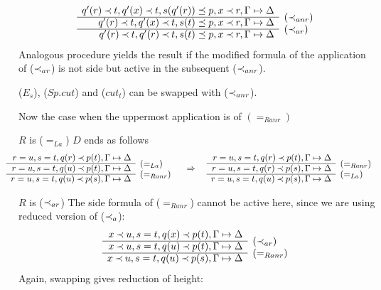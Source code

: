 \begin{PROOF}
\begin{LS}
\[ \begin{array}{rl}
q'(r)\Incl t, q'(x)\Incl t, s(q'(r))\preceq p, x\Incl r, \Gamma\Seq\Delta \\ \cline{1-1}
q'(r)\Incl t, q'(x)\Incl t, s(t)\preceq p, x\Incl r, \Gamma\Seq\Delta  &
\raisebox{1.2ex}[1.5ex][0ex]{$(\Incl_{anr})$} \\ \cline{1-1}
q'(r)\Incl t, q'(r)\Incl t, s(t)\preceq p, x\Incl r, \Gamma\Seq\Delta  &
\raisebox{1.2ex}[1.5ex][0ex]{$(\Incl_{ar})$}
\end{array} \]
Analogous procedure yields the result if the modified formula of the
application of ($\mathbin{\prec}_{ar}$) is not side but active in the subsequent ($\mathbin{\prec}_{anr}$).
%
\item ($E_s$), ($Sp.cut$) and ($cut_t$) can be swapped with ($\mathbin{\prec}_{anr}$).
\end{LS}
Now the case when the uppermost application is of $(=_{Ranr})$
\begin{LS}
\item $R$ is ($=_{La}$) $D$ ends as follows
\[ \hspace*{-1.5em}  \begin{array}{rl} 
r=u, s=t, q(r)\Incl p(t), \GSD \\ \cline{1-1}
r=u, s=t, q(u)\Incl p(t), \GSD & \rabove{(=_{La})} \\ \cline{1-1}
r=u, s=t, q(u)\Incl p(s), \GSD & \rabove{(=_{Ranr})} \end{array} \conv
\begin{array}{rl}
r=u, s=t, q(r)\Incl p(t), \GSD \\ \cline{1-1}
r=u, s=t, q(r)\Incl p(s), \GSD & \rabove{(=_{Ranr})} \\ \cline{1-1}
r=u, s=t, q(u)\Incl p(s), \GSD & \rabove{(=_{La})} \end{array} \]
%
\item $R$ is ($\mathbin{\prec}_{ar}$) The side formula of ($=_{Ranr}$) cannot be active
here, since we are using reduced version of ($\mathbin{\prec}_a$):
\[ \begin{array}{rl}
x\Incl u, s=t, q(x)\Incl p(t), \GSD \\ \cline{1-1}
x\Incl u, s=t, q(u)\Incl p(t), \GSD & \rabove{(\Incl_{ar})} \\ \cline{1-1}
x\Incl u, s=t, q(u)\Incl p(s), \GSD & \rabove{(=_{Ranr})} \end{array} \]
Again, swapping gives reduction of height:
\[ \begin{array}{rl}

\end{array}\]
\end{LS}
\end{PROOF}
